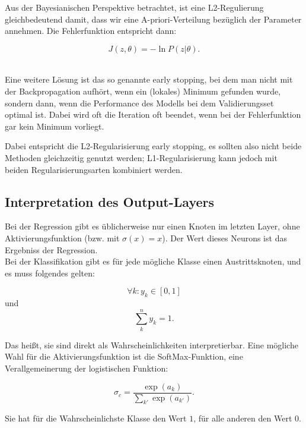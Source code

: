 Aus der Bayesianischen Perspektive betrachtet, ist eine L2-Regulierung gleichbedeutend damit, dass wir eine A-priori-Verteilung bezüglich der Parameter annehmen. Die Fehlerfunktion entspricht dann:

\begin{equation}
	J(z, \theta) = - \ln P (z | \theta).
\end{equation}

\cite{bengio2012practical} \\
Eine weitere Lösung ist das so genannte early stopping, bei dem man nicht mit der Backpropagation aufhört, wenn ein (lokales) Minimum gefunden wurde, sondern dann, wenn die Performance des Modells bei dem Validierungsset optimal ist. Dabei wird oft die Iteration oft beendet, wenn bei der Fehlerfunktion gar kein Minimum vorliegt.  

Dabei entspricht die L2-Regularisierung early stopping, es sollten also nicht beide Methoden gleichzeitig genutzt werden; L1-Regularisierung kann jedoch mit beiden Regularisierungsarten kombiniert werden. \cite{bengio2012practical}

\subsection{Interpretation des Output-Layers}
Bei der Regression gibt es üblicherweise nur einen Knoten im letzten Layer, ohne Aktivierungsfunktion (bzw. mit $\sigma(x) = x$). Der Wert dieses Neurons ist das Ergebniss der Regression. \\

Bei der Klassifikation gibt es für jede mögliche Klasse einen Austrittsknoten, und es muss folgendes gelten:

\begin{equation}
 	\forall	k: y_k \in [0,1]
 \end{equation} 
 und 
 \begin{equation}
 	\sum_k^n y_k = 1.
 \end{equation}

Das heißt, sie sind direkt als Wahrscheinlichkeiten interpretierbar. Eine mögliche Wahl für die Aktivierungsfunktion ist die SoftMax-Funktion, eine Verallgemeinerung der logistischen Funktion:

\begin{equation}
	\sigma_c = \frac{\exp (a_k)}{\sum_{k'} \exp (a_{k'})}.
\end{equation}

Sie hat für die Wahrscheinlichste Klasse den Wert $1$, für alle anderen den Wert $0$. \cite{bishop1995neural}

